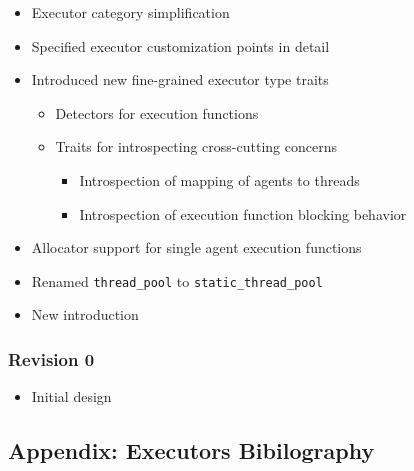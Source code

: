 \documentclass[a4paper,12pt,notitlepage,twoside,openright]{article}
\begin{document}
\begin{itemize}

\item
  Executor category simplification
\item
  Specified executor customization points in detail
\item
  Introduced new fine-grained executor type traits

  \begin{itemize}

  \item
    Detectors for execution functions
  \item
    Traits for introspecting cross-cutting concerns

    \begin{itemize}

    \item
      Introspection of mapping of agents to threads
    \item
      Introspection of execution function blocking behavior
    \end{itemize}
  \end{itemize}
\item
  Allocator support for single agent execution functions
\item
  Renamed \texttt{thread_pool} to
  \texttt{static_thread_pool}
\item
  New introduction
\end{itemize}

\hypertarget{revision-0}{%
\subsubsection{Revision 0}\label{revision-0}}

\begin{itemize}

\item
  Initial design
\end{itemize}

\hypertarget{appendix-executors-bibilography}{%
\subsection{Appendix: Executors
Bibilography}\label{appendix-executors-bibilography}}
\end{document}

